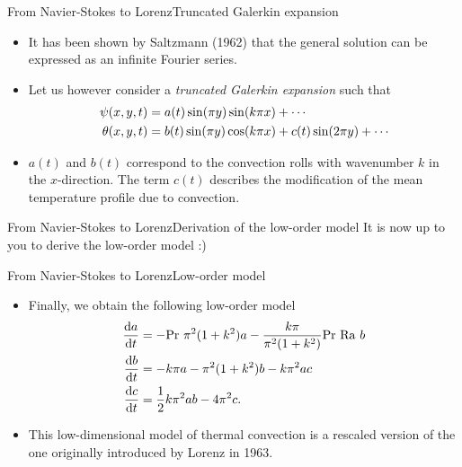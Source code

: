 \documentclass[usenames,dvipsnames,svgnames,10pt,aspectratio=169]{beamer}
\begin{document}
\begin{frame}[t, c]{From Navier-Stokes to Lorenz}{Truncated Galerkin expansion}
	\begin{itemize}
		\item It has been shown by Saltzmann (1962) that the general solution can be expressed as an infinite Fourier series.

		\bigskip

		\item Let us however consider a \emph{truncated Galerkin expansion} such that
		\begin{equation}
			\begin{aligned}
				\psi(x, y, t) & = a(t) \sin(\pi y) \sin(k \pi x) + \cdots \\
				\theta(x, y, t) & = b(t) \sin(\pi y) \cos(k \pi x) + c(t) \sin(2 \pi y) + \cdots
			\end{aligned}
			\notag
		\end{equation}

		\bigskip

		\item $a(t)$ and $b(t)$ correspond to the convection rolls with wavenumber $k$ in the $x$-direction. The term $c(t)$ describes the modification of the mean temperature profile due to convection.
	\end{itemize}

	\vspace{1cm}
\end{frame}

\begin{frame}[t, c]{From Navier-Stokes to Lorenz}{Derivation of the low-order model}
	\centering
	It is now up to you to derive the low-order model :)

	\vspace{1cm}
\end{frame}

\begin{frame}[t, c]{From Navier-Stokes to Lorenz}{Low-order model}
	\begin{itemize}
		\item Finally, we obtain the following low-order model
		\begin{equation}
			\begin{aligned}
				\displaystyle \frac{\mathrm{d}a}{\mathrm{d}t} & = -\mathrm{Pr}\ \pi^2 (1+k^2)a - \frac{k \pi}{\pi^2(1+k^2)} \mathrm{Pr}\ \mathrm{Ra}\ b\\
				\displaystyle \frac{\mathrm{d}b}{\mathrm{d}t} & = -k \pi a - \pi^2(1+k^2)b - k\pi^2 a c \\
				\displaystyle \frac{\mathrm{d}c}{\mathrm{d}t} & = \displaystyle \frac{1}{2} k \pi^2 ab - 4\pi^2 c.
			\end{aligned}
			\notag
		\end{equation}

		\medskip

		\item This low-dimensional model of thermal convection is a rescaled version of the one originally introduced by Lorenz in 1963.
	\end{itemize}

	\vspace{1cm}
\end{frame}
\end{document}
